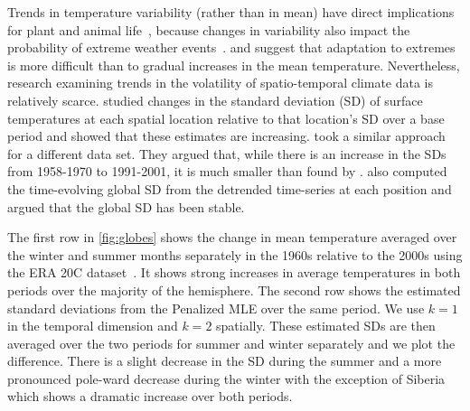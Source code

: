 \documentclass[ejs,noshowframe]{imsart}
\theoremstyle{plain}
\theoremstyle{definition}
\begin{document}
Trends in temperature variability (rather than in mean) have direct
implications for plant and animal life~\citep{huntingford_no_2013},
because changes in variability also impact the probability of extreme weather
events~\citep{VasseurDeLong2014}. 
\citet{hansen_perception_2012} and \citet{huntingford_no_2013}
suggest that adaptation to extremes is more difficult than
to gradual increases in the mean temperature. 
Nevertheless, research examining trends in the volatility of
spatio-temporal climate data is relatively scarce. 
\citet{hansen_perception_2012} studied
changes in 
the standard deviation (SD) of  surface temperatures
at each spatial location relative to that
location's SD over a base period and showed
that these estimates are increasing.
\citet{huntingford_no_2013} took a similar
approach for a different data set. They argued that, while there
is an increase in the SDs from 1958-1970 to 1991-2001, it
is much smaller than found by
\citet{hansen_perception_2012}. \citet{huntingford_no_2013} also computed the
time-evolving global SD from the detrended time-series at each
position and argued that the global SD has been
stable. 

The first row in \autoref{fig:globes} shows the change in mean temperature averaged
over the winter and summer months separately in the 1960s relative to the 2000s
using the ERA 20C dataset~\citep{PoliHersbach2016}. It shows strong increases in
average temperatures in both periods over the majority of the hemisphere.
The second row shows the estimated standard deviations from
the Penalized MLE over the same period. We use $k=1$ in the temporal dimension and
$k=2$ spatially. These estimated SDs are then averaged over the two periods for
summer and winter separately and we plot the difference. There is a slight
decrease in the SD during the summer and a more pronounced pole-ward decrease
during the winter with the exception of Siberia which shows a dramatic increase
over both periods. 
\end{document}
